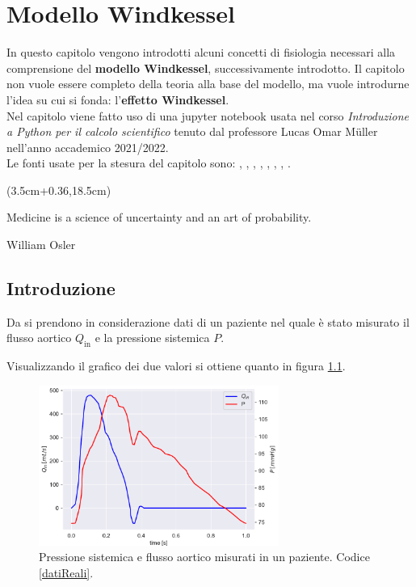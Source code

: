 \chapter{Modello Windkessel}\label{windkessel}
In questo capitolo vengono introdotti alcuni concetti di fisiologia necessari alla comprensione del \textbf{modello Windkessel}, successivamente introdotto. Il capitolo non vuole essere completo della teoria alla base del modello, ma vuole introdurne l'idea su cui si fonda: l'\textbf{effetto Windkessel}.\\
Nel capitolo viene fatto uso di una jupyter notebook usata nel corso \textit{Introduzione a Python per il calcolo scientifico} tenuto dal professore Lucas Omar Müller nell'anno accademico 2021/2022.\\
Le fonti usate per la stesura del capitolo sono: \cite{AaronsonPhilipI.PhilipIrving2020Tcsa}, \cite{wiki:Vascularresistance}, \cite{wiki:Compliance}, \cite{wiki:WindkesselEffect},
\cite{wiki:cicloCardiaco},
\cite{wiki:DiagrammaWiggers},
\cite{westerhof_arterial_2008}, \cite{ghitti_toro_müller_2022}. \\



\begin{textblock*}{0.64\textwidth}(3.5cm+0.36\textwidth,18.5cm)
\epigraph{Medicine is a science of uncertainty and an art of probability.}{William Osler}
\end{textblock*}




\newpage

\section{Introduzione}
Da \cite{westerhof_arterial_2008} si prendono in considerazione dati di un paziente nel quale è stato misurato il flusso aortico $Q_{\text{in}}$ e la pressione sistemica $P$.

Visualizzando il grafico dei due valori si ottiene quanto in figura \ref{figDatiReali}.

\begin{figure}[h]
    \centering
    \includegraphics[width=0.7\textwidth]{images/Windkessel/DatiReali.pdf}
    \caption{Pressione sistemica e flusso aortico misurati in un paziente. Codice \ref{datiReali}.}
    \label{figDatiReali}
\end{figure}


